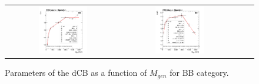 \begin{figure}[ht]
\begin{center}
\begin{tabular}{cccc}
      \includegraphics[width=0.45\textwidth]{figures/Zprime/2017/mass_resolution/High_Mass/BB_CutL} &
      \includegraphics[width=0.45\textwidth]{figures/Zprime/2017/mass_resolution/High_Mass/BB_CutR} \\
    \end{tabular}
    \caption{Parameters of the dCB as a function of $M_{gen}$ for BB category.
    \label{fig:fit_parameters_BB}}
  \end{center}
\end{figure}

